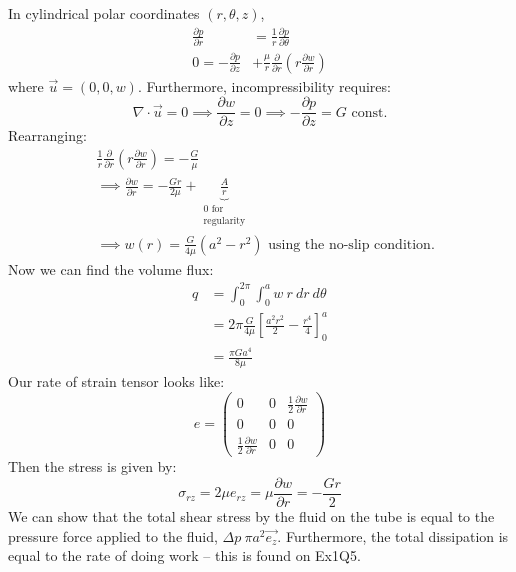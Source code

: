 \documentclass[../Main.tex]{subfiles}
\begin{document}
In cylindrical polar coordinates $(r, \theta, z)$,
\begin{align*}
    \frac{\partial p}{\partial r} &= \frac1r \frac{\partial p}{\partial \theta} \\
    0 = -\frac{\partial p}{\partial z} &+ \frac{\mu}{r} \frac{\partial}{\partial r} \left(r \frac{\partial w}{\partial r}\right)
\end{align*}
where $\vec{u} = (0, 0, w)$. Furthermore, incompressibility requires:
\begin{equation*}
    \nabla \cdot \vec{u} = 0 \implies \frac{\partial w}{\partial z} = 0 \implies -\frac{\partial p}{\partial z} = G \text{ const.}
\end{equation*}
Rearranging:
\begin{align*}
    &\frac1r \frac{\partial}{\partial r} \left(r \frac{\partial w}{\partial r}\right) = -\frac{G}{\mu} \\
    &\implies \frac{\partial w}{\partial r} = -\frac{Gr}{2\mu} + \underbrace{\frac{A}{r}}_{\substack{0 \text{ for}\\\text{regularity}}} \\
    &\implies w(r) = \frac{G}{4\mu} \left(a^2 - r^2\right) \text{ using the no-slip condition.}
\end{align*}
Now we can find the volume flux:
\begin{align*}
    q &= \int_{0}^{2\pi} \int_{0}^{a} w~r~dr~d\theta  \\
    &= 2\pi \frac{G}{4\mu} \left[\frac{a^2 r^2}{2} - \frac{r^4}{4}\right]_0^a \\
    &= \frac{\pi G a^4}{8\mu}
\end{align*}
Our rate of strain tensor looks like:
\begin{equation*}
    e = 
    \begin{pmatrix}
        0 & 0 & \frac12 \frac{\partial w}{\partial r} \\
        0 & 0 & 0 \\
        \frac12 \frac{\partial w}{\partial r} & 0 & 0
    \end{pmatrix}
\end{equation*}
Then the stress is given by:
\begin{equation*}
    \sigma_{rz} = 2\mu e_{rz} = \mu \frac{\partial w}{\partial r} = -\frac{Gr}{2}
\end{equation*}
We can show that the total shear stress by the fluid on the tube is equal to the pressure force applied to the fluid, $\Delta p~\pi a^2 \vec{e_z}$. Furthermore, the total dissipation is equal to the rate of doing work -- this is found on Ex1Q5.
\end{document}
